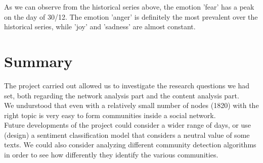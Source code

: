 \documentclass[12pt,journal,compsoc]{IEEEtran}
\begin{document}
As we can observe from the historical series above, the emotion 'fear' has a peak on the day of 30/12. The emotion 'anger' is definitely the most prevalent over the historical series, while 'joy' and 'sadness' are almost constant.

\section{Summary}
The project carried out allowed us to investigate the research questions we had set, both regarding the network analysis part and the content analysis part.\\
We undurstood that even with a relatively small number of nodes (1820) with the right topic is very easy to form communities inside a social network.\\
Future developments of the project could consider a wider range of days, or use (design) a sentiment classification model that considers a neutral value of some texts. We could also consider analyzing different community detection algorithms in order to see how differently they identify the various communities.


\nocite{*}
\printbibliography
\end{document}
